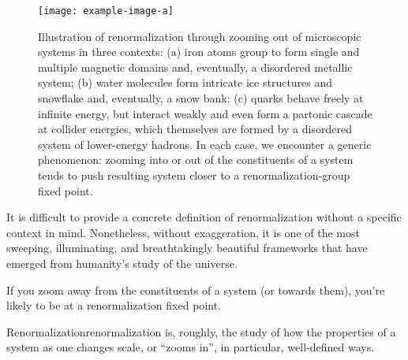 \begin{figure}[]
    \centering
    \texttt{[image: example-image-a]}
    \caption[Illustration of renormalization in three contexts (magnetic domains, snowflakes, and jets) which exemplify how zooming into or out of the constituents of a system tends to take the system nearer to a renormalization-group fixed point.]{
        Illustration of renormalization through zooming out of microscopic systems in three contexts:
        (a) iron atoms group to form single and multiple magnetic domains and, eventually, a disordered metallic system;
        (b) water molecules form intricate ice structures and snowflake and, eventually, a snow bank;
        (c) quarks behave freely at infinite energy, but interact weakly and even form a partonic cascade at collider energies, which themselves are formed by a disordered system of lower-energy hadrons.
        In each case, we encounter a generic phenomenon:
        zooming into or out of the constituents of a system tends to push resulting system closer to a renormalization-group fixed point.
    }
    \label{fig:renormalization}
\end{figure}


It is difficult to provide a concrete definition of renormalization without a specific context in mind.
%
Nonetheless, without exaggeration, it is one of the most sweeping, illuminating, and breathtakingly beautiful frameworks that have emerged from humanity's study of the universe.

If you zoom away from the constituents of a system (or towards them), you're likely to be at a renormalization fixed point.

\begin{definitionbox}{Renormalization}{renormalization}
    \vspace{3pt}
     is, roughly, the study of how the properties of a system as one changes scale, or ``zooms in'', in particular, well-defined ways.
\end{definitionbox}

